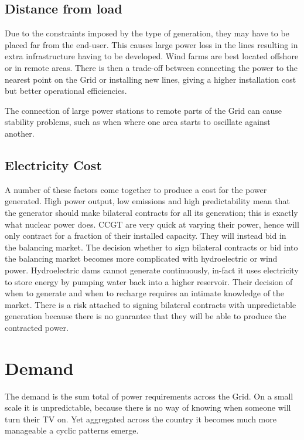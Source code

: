 \documentclass[a4paper,oneside,12pt]{report}
\begin{document}
\subsection{Distance from load}

Due to the constraints imposed by the type of generation, they may have to be placed far from the end-user. This causes large power loss in the lines resulting in extra infrastructure having to be developed. Wind farms are best located offshore or in remote areas. There is then a trade-off between connecting the power to the nearest point on the Grid or installing new lines, giving a higher installation cost but better operational efficiencies.

The connection of large power stations to remote parts of the Grid can cause stability problems, such as when where one area starts to oscillate against another.

\subsection{Electricity Cost}

A number of these factors come together to produce a cost for the power generated. High power output, low emissions and high predictability mean that the generator should make bilateral contracts for all its generation; this is exactly what nuclear power does. CCGT are very quick at varying their power, hence will only contract for a fraction of their installed capacity. They will instead bid in the balancing market. The decision whether to sign bilateral contracts or bid into the balancing market becomes more complicated with hydroelectric or wind power. Hydroelectric dams cannot generate continuously, in-fact it uses electricity to store energy by pumping water back into a higher reservoir. Their decision of when to generate and when to recharge requires an intimate knowledge of the market. There is a risk attached to signing bilateral contracts with unpredictable generation because there is no guarantee that they will be able to produce the contracted power.

\section{Demand}

The demand is the sum total of power requirements across the Grid. On a small scale it is unpredictable, because there is no way of knowing when someone will turn their TV on. Yet aggregated across the country it becomes much more manageable a cyclic patterns emerge.
\end{document}
